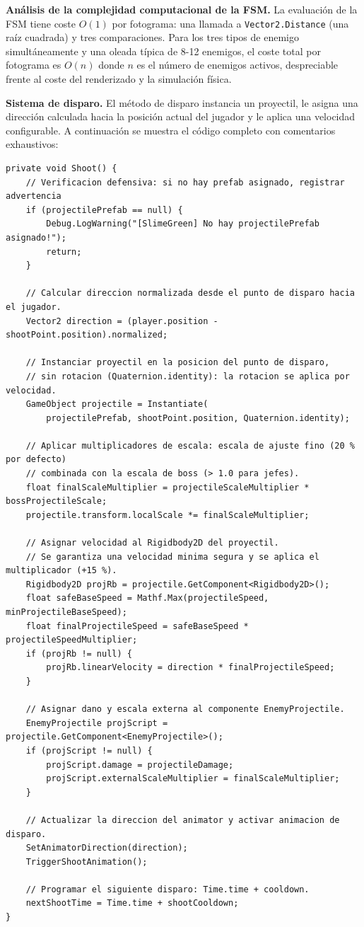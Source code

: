\textbf{Análisis de la complejidad computacional de la FSM.} La evaluación de la FSM tiene coste $O(1)$ por fotograma: una llamada a \texttt{Vector2.Distance} (una raíz cuadrada) y tres comparaciones. Para los tres tipos de enemigo simultáneamente y una oleada típica de 8-12 enemigos, el coste total por fotograma es $O(n)$ donde $n$ es el número de enemigos activos, despreciable frente al coste del renderizado y la simulación física.

\textbf{Sistema de disparo.} El método de disparo instancia un proyectil, le asigna una dirección calculada hacia la posición actual del jugador y le aplica una velocidad configurable. A continuación se muestra el código completo con comentarios exhaustivos:

\begin{lstlisting}
private void Shoot() {
    // Verificacion defensiva: si no hay prefab asignado, registrar advertencia
    if (projectilePrefab == null) {
        Debug.LogWarning("[SlimeGreen] No hay projectilePrefab asignado!");
        return;
    }
    
    // Calcular direccion normalizada desde el punto de disparo hacia el jugador.
    Vector2 direction = (player.position - shootPoint.position).normalized;
    
    // Instanciar proyectil en la posicion del punto de disparo,
    // sin rotacion (Quaternion.identity): la rotacion se aplica por velocidad.
    GameObject projectile = Instantiate(
        projectilePrefab, shootPoint.position, Quaternion.identity);
    
    // Aplicar multiplicadores de escala: escala de ajuste fino (20 % por defecto)
    // combinada con la escala de boss (> 1.0 para jefes).
    float finalScaleMultiplier = projectileScaleMultiplier * bossProjectileScale;
    projectile.transform.localScale *= finalScaleMultiplier;
    
    // Asignar velocidad al Rigidbody2D del proyectil.
    // Se garantiza una velocidad minima segura y se aplica el multiplicador (+15 %).
    Rigidbody2D projRb = projectile.GetComponent<Rigidbody2D>();
    float safeBaseSpeed = Mathf.Max(projectileSpeed, minProjectileBaseSpeed);
    float finalProjectileSpeed = safeBaseSpeed * projectileSpeedMultiplier;
    if (projRb != null) {
        projRb.linearVelocity = direction * finalProjectileSpeed;
    }
    
    // Asignar dano y escala externa al componente EnemyProjectile.
    EnemyProjectile projScript = projectile.GetComponent<EnemyProjectile>();
    if (projScript != null) {
        projScript.damage = projectileDamage;
        projScript.externalScaleMultiplier = finalScaleMultiplier;
    }
    
    // Actualizar la direccion del animator y activar animacion de disparo.
    SetAnimatorDirection(direction);
    TriggerShootAnimation();
    
    // Programar el siguiente disparo: Time.time + cooldown.
    nextShootTime = Time.time + shootCooldown;
}
\end{lstlisting}


